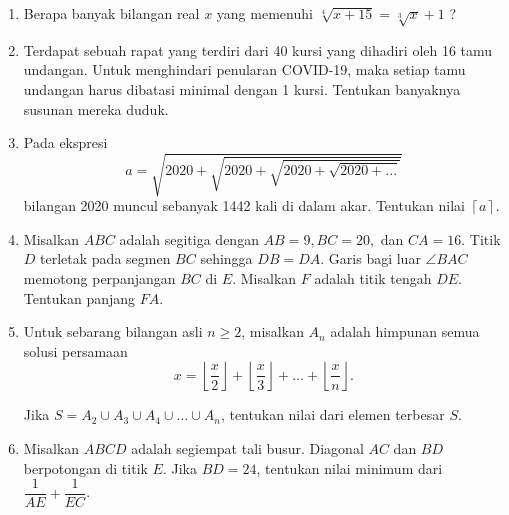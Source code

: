 \documentclass[11pt]{scrartcl}
\begin{document}
\begin{enumerate}[resume]
		\item Berapa banyak bilangan real $x$ yang memenuhi $\sqrt[4]{x+15} = \sqrt[3]{x}+1$ ?
		
		\item  Terdapat sebuah rapat yang terdiri dari 40 kursi yang dihadiri oleh 16 tamu undangan.
		Untuk menghindari penularan COVID-19, maka setiap tamu undangan harus dibatasi minimal
		dengan 1 kursi. Tentukan banyaknya susunan mereka duduk.

		
		\item Pada ekspresi $$a= \sqrt{2020+\sqrt{2020+\sqrt{2020+\sqrt{2020+...}}}}$$
		bilangan 2020 muncul sebanyak 1442 kali di dalam akar. Tentukan nilai $\left \lceil a \right \rceil$.
		
		\item Misalkan $ABC$ adalah segitiga dengan $AB=9, BC=20,$ dan $CA=16$. Titik $D$ terletak pada segmen $BC$ sehingga $DB=DA$. Garis bagi luar $\angle BAC$ memotong perpanjangan $BC$ di $E$. Misalkan $F$ adalah titik tengah $DE$. Tentukan panjang $FA$.
		
		\item Untuk sebarang bilangan asli $n \ge 2$, misalkan $A_n$ adalah himpunan semua solusi persamaan $$x=\left\lfloor \frac{x}{2}\right \rfloor+\left\lfloor \frac{x}{3}\right \rfloor+\dots+\left\lfloor\frac{x}{n} \right \rfloor.$$
		
		Jika $S = A_2 \cup A_3 \cup A_4 \cup \dots \cup A_n$, tentukan nilai dari elemen terbesar $S$.
		
		\item Misalkan $ABCD$ adalah segiempat tali busur. Diagonal $AC$ dan $BD$ berpotongan di titik $E$. Jika $BD=24$, tentukan nilai minimum dari $\dfrac{1}{AE}+\dfrac{1}{EC}$.
\end{enumerate}
	
	
\end{document}
